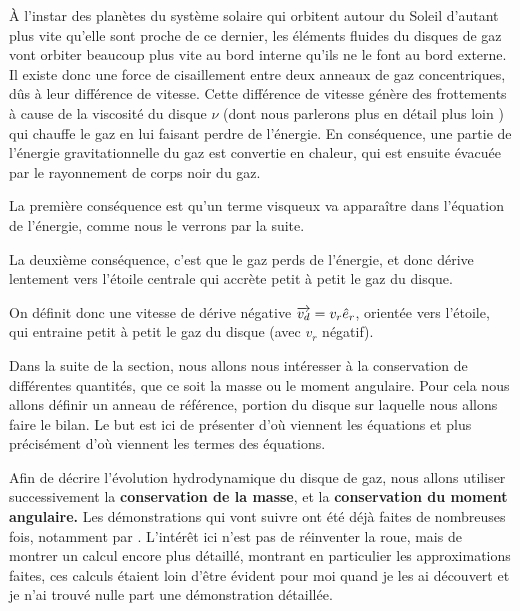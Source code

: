 \bigskip

À l'instar des planètes du système solaire qui orbitent autour du Soleil d'autant plus vite qu'elle sont proche de ce dernier, les éléments fluides du disques de gaz vont orbiter beaucoup plus vite au bord interne qu'ils ne le font au bord externe. Il existe donc une force de cisaillement entre deux anneaux de gaz concentriques, dûs à leur différence de vitesse. Cette différence de vitesse génère des frottements à cause de la viscosité du disque $\nu$ (dont nous parlerons plus en détail plus loin ) qui chauffe le gaz en lui faisant perdre de l'énergie. En conséquence, une partie de l'énergie gravitationnelle du gaz est convertie en chaleur, qui est ensuite évacuée par le rayonnement de corps noir du gaz. 

\bigskip

La première conséquence est qu'un terme visqueux va apparaître dans l'équation de l'énergie, comme nous le verrons par la suite. 

La deuxième conséquence, c'est que le gaz perds de l'énergie, et donc dérive lentement vers l'étoile centrale qui accrète petit à petit le gaz du disque. 

On définit donc une vitesse de dérive négative ${\overrightarrow{v_d}} = v_r \hat{e}_r$, orientée vers l'étoile, qui entraine petit à petit le gaz du disque (avec $v_r$ négatif).

Dans la suite de la section, nous allons nous intéresser à la conservation de différentes quantités, que ce soit la masse ou le moment angulaire. Pour cela nous allons définir un anneau de référence, portion du disque sur laquelle nous allons faire le bilan. Le but est ici de présenter d'où viennent les équations et plus précisément d'où viennent les termes des équations. 

\bigskip

Afin de décrire l'évolution hydrodynamique du disque de gaz, nous allons utiliser successivement la \textbf{conservation de la masse}, et la \textbf{conservation du moment angulaire.} Les démonstrations qui vont suivre ont été déjà faites de nombreuses fois, notamment par \citep{pringle1981accretion}. L'intérêt ici n'est pas de réinventer la roue, mais de montrer un calcul encore plus détaillé, montrant en particulier les approximations faites, ces calculs étaient loin d'être évident pour moi quand je les ai découvert et je n'ai trouvé nulle part une démonstration détaillée.


